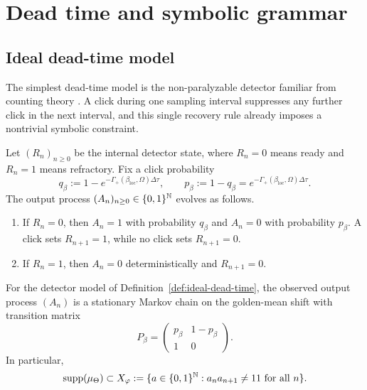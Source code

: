 \section{Dead time and symbolic grammar}\label{sec:bridge:deadtime}

\subsection{Ideal dead-time model}

The simplest dead-time model is the non-paralyzable detector familiar from counting theory \cite{Muller1973,CantorTeich1975}. A click during one sampling interval suppresses any further click in the next interval, and this single recovery rule already imposes a nontrivial symbolic constraint.

\begin{definition}\label{def:ideal-dead-time}
Let $(R_n)_{n\ge 0}$ be the internal detector state, where $R_n=0$ means ready and $R_n=1$ means refractory. Fix a click probability
\[
q_\beta:=1-e^{-\Gamma_+(\beta_{\mathrm{loc}},\Omega)\Delta\tau},
\qquad
p_\beta:=1-q_\beta=e^{-\Gamma_+(\beta_{\mathrm{loc}},\Omega)\Delta\tau}.
\]
The output process $(A_n)_{n\ge 0}\in\{0,1\}^{\mathbb{N}}$ evolves as follows.
\begin{enumerate}[label=(\roman*),leftmargin=*,itemsep=2pt]
  \item If $R_n=0$, then $A_n=1$ with probability $q_\beta$ and $A_n=0$ with probability $p_\beta$. A click sets $R_{n+1}=1$, while no click sets $R_{n+1}=0$.
  \item If $R_n=1$, then $A_n=0$ deterministically and $R_{n+1}=0$.
\end{enumerate}
\end{definition}

\begin{theorem}\label{thm:dead-time-golden}
For the detector model of Definition~\ref{def:ideal-dead-time}, the observed output process $(A_n)$ is a stationary Markov chain on the golden-mean shift with transition matrix
\begin{equation}\label{eq:bridge-markov-matrix}
P_\beta=
\begin{pmatrix}
p_\beta & 1-p_\beta\\
1 & 0
\end{pmatrix}.
\end{equation}
In particular,
\[
\operatorname{supp}(\mu_\Theta)\subset X_\varphi
:=
\{a\in\{0,1\}^{\mathbb{N}}:a_na_{n+1}\neq 11\ \text{for all }n\}.
\]
\end{theorem}

